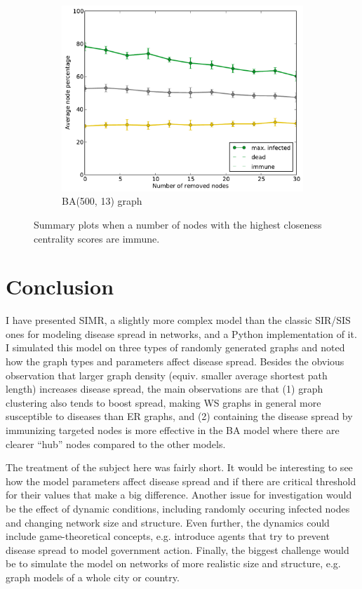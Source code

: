 \documentclass[11pt]{article} %
\begin{document}
\begin{figure}[tb]
\begin{subfigure}[b]{0.5\textwidth}
    \includegraphics[width=\textwidth]{figures/hubs_BA_500_13}
    \caption{BA(500, 13) graph}
  \end{subfigure}
  \caption{Summary plots when a number of nodes with the highest
    closeness centrality scores are immune.}
  \label{fig:hub_sum}
\end{figure}

\section{Conclusion}
I have presented SIMR, a slightly more complex model than the classic SIR/SIS
ones
for modeling disease spread in networks, and a Python implementation of it.
I simulated this model on three types of randomly generated graphs and
noted how the graph types and parameters affect disease spread. Besides the
obvious observation that larger graph density (equiv. smaller average
shortest path length) increases disease spread, the main observations
are that (1) graph clustering also tends to boost spread, making WS graphs
in general more susceptible to diseases than ER graphs, and (2) containing
the disease spread by immunizing targeted nodes is more effective in the BA
model where there are clearer ``hub'' nodes compared to the other models.

The treatment of the subject here was fairly short. It would be interesting
to see how the model parameters affect disease spread and if there are critical
threshold for their values that make a big difference. Another issue for
investigation would be the effect of dynamic conditions, including randomly
occuring infected nodes and changing network size and structure. Even further,
the dynamics could include game-theoretical concepts, e.g. introduce agents
that try to prevent disease spread to model government action.
Finally, the biggest challenge would be to simulate the model on networks
of more realistic size and structure, e.g. graph models of a whole city
or country.



\end{document}
